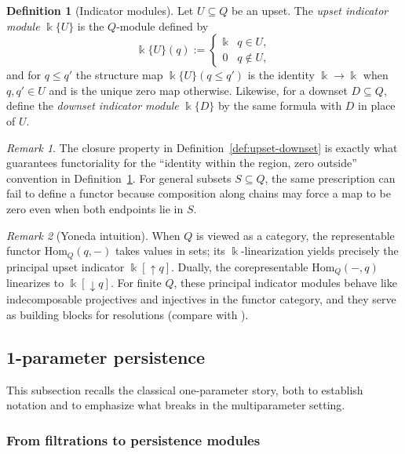 \documentclass{article}
\newcommand{\kk}{\Bbbk}
\newcommand{\<}{\langle}
\renewcommand{\>}{\rangle}
\theoremstyle{definition}
\newtheorem{defn}[theorem]{Definition}
\theoremstyle{remark}
\newtheorem*{remark}{Remark}
\begin{document}
	\begin{defn}[Indicator modules]\label{def:indicator-modules}
		Let $U\subseteq Q$ be an upset.  The \emph{upset indicator module} $\kk\{U\}$ is the
		$Q$-module defined by
		\[
		\kk\{U\}(q) :=
		\begin{cases}
			\kk & q\in U,\\
			0 & q\notin U,
		\end{cases}
		\]
		and for $q\leq q'$ the structure map $\kk\{U\}(q\leq q')$ is the identity
		$\kk\to\kk$ when $q,q'\in U$ and is the unique zero map otherwise.  Likewise, for a
		downset $D\subseteq Q$, define the \emph{downset indicator module} $\kk\{D\}$ by the
		same formula with $D$ in place of $U$.
	\end{defn}
	
	\begin{remark}
		The closure property in Definition~\ref{def:upset-downset} is exactly what guarantees
		functoriality for the ``identity within the region, zero outside'' convention in
		Definition~\ref{def:indicator-modules}.  For general subsets $S\subseteq Q$, the same
		prescription can fail to define a functor because composition along chains may force
		a map to be zero even when both endpoints lie in $S$.
	\end{remark}
	
	\begin{remark}[Yoneda intuition]\label{rmk:yoneda-principal-upset}
		When $Q$ is viewed as a category, the representable functor
		$\mathrm{Hom}_Q(q,-)$ takes values in sets; its $\kk$-linearization yields precisely
		the principal upset indicator $\kk[\uparrow q]$.  Dually, the corepresentable
		$\mathrm{Hom}_Q(-,q)$ linearizes to $\kk[\downarrow q]$.  For finite $Q$, these
		principal indicator modules behave like indecomposable projectives and injectives
		in the functor category, and they serve as building blocks for resolutions (compare
		with \cite{Mil20}).
	\end{remark}
	
	\subsection{1-parameter persistence}\label{sec:background:1d}
	
	This subsection recalls the classical one-parameter story, both to establish
	notation and to emphasize what breaks in the multiparameter setting.
	
	\subsubsection*{From filtrations to persistence modules}
	
\end{document}
